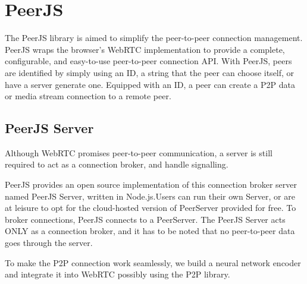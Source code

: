 \section{PeerJS}

The PeerJS library is aimed to simplify the peer-to-peer connection management. 
PeerJS wraps the browser's WebRTC implementation to provide a complete, configurable, 
and easy-to-use peer-to-peer connection API. 
With PeerJS, peers are identified by simply using an ID, a string that the peer 
can choose itself, or have a server generate one. 
Equipped with an ID, a peer can create a P2P data or media stream connection to a remote peer.~\cite{PeerJSsimplifiesWebRTC}

\subsection{PeerJS Server}

Although WebRTC promises peer-to-peer communication, a server is still required to 
act as a connection broker, and handle signalling.

PeerJS provides an open source implementation of this connection broker 
server named PeerJS Server, written in Node.js.Users can run their own Server, 
or are at leisure to opt for the cloud-hosted version of PeerServer provided for free.
To broker connections, PeerJS connects to a PeerServer. The PeerJS Server acts ONLY as 
a connection broker, and it has to be noted that no peer-to-peer data goes through the server.~\cite{TamingWebRTCwithPeerJS}

To make the P2P connection work seamlessly, we build a neural network encoder and 
integrate it into WebRTC possibly using the P2P library.
